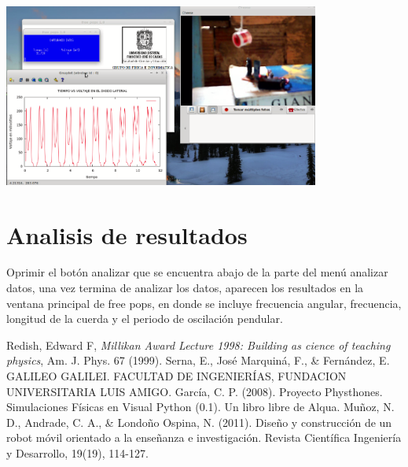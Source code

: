 \documentclass[12pt]{article}
\newenvironment{Figure}
{\par\medskip\noindent\minipage{\linewidth}}
{\endminipage\par\medskip}
\begin{document}
\begin{multicols}{2}
\begin{Figure}
\center
\includegraphics[width=8.cm, height=6cm]{fig/graf1.png}
\label{fig:g14}
\end{Figure}
\vspace{0.2cm}

\section{Analisis de resultados}
Oprimir el botón analizar que se encuentra abajo de la parte del menú analizar datos, una vez termina de analizar los datos, aparecen los resultados en la ventana principal de free pops, en donde se incluye frecuencia angular, frecuencia, longitud de la cuerda y el periodo de oscilación pendular.



\end{multicols}
\begin{thebibliography}{99}
 Redish, Edward F, \emph{Millikan Award Lecture 1998: Building as cience of teaching physics}, Am. J. Phys. 67 (1999).
 Serna, E., José Marquiná, F., \& Fernández, E. GALILEO GALILEI. FACULTAD DE INGENIERÍAS, FUNDACION UNIVERSITARIA LUIS AMIGO.
 García, C. P. (2008). Proyecto Physthones. Simulaciones Físicas en Visual Python (0.1). Un libro libre de Alqua.
 Muñoz, N. D., Andrade, C. A., \& Londoño Ospina, N. (2011). Diseño y construcción de un robot móvil orientado a la enseñanza e investigación. Revista Científica Ingeniería y Desarrollo, 19(19), 114-127.

\end{thebibliography}
\end{document}
